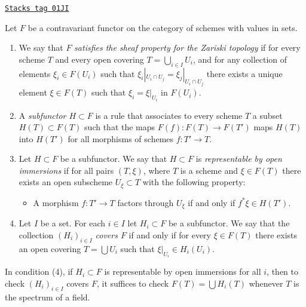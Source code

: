 \begin{definition}
\label{schemes-definition-representable-by-open-immersions}
\href{https://stacks.math.columbia.edu/tag/01JI}{\texttt{Stacks tag 01JI}}

Let $F$ be a contravariant functor on the category
of schemes with values in sets.
\begin{enumerate}
\item We say that $F$ {\it satisfies the sheaf property for the
Zariski topology} if for every scheme $T$ and every open covering
$T = \bigcup_{i \in I} U_i$, and for any collection of elements
$\xi_i \in F(U_i)$ such that $\xi_i|_{U_i \cap U_j} =
\xi_j|_{U_i \cap U_j}$ there exists a unique element
$\xi \in F(T)$ such that $\xi_i = \xi|_{U_i}$ in $F(U_i)$.
\item A {\it subfunctor $H \subset F$} is a rule that associates
to every scheme $T$ a subset $H(T) \subset F(T)$ such that
the maps $F(f) : F(T) \to F(T')$ maps $H(T)$ into
$H(T')$ for all morphisms of schemes $f : T' \to T$.
\item Let $H \subset F$ be a subfunctor. We say that
$H \subset F$ is {\it representable by open immersions}
if for all pairs $(T, \xi)$, where $T$ is a scheme and $\xi \in F(T)$
there exists an open subscheme $U_\xi \subset T$ with the following
property:
\begin{itemize}
\item[(*)] A morphism $f : T' \to T$ factors through $U_\xi$ if and only
if $f^*\xi \in H(T')$.
\end{itemize}
\item Let $I$ be a set. For each $i \in I$ let $H_i \subset F$
be a subfunctor. We say that the collection $(H_i)_{i \in I}$
{\it covers $F$} if and only if for every $\xi \in F(T)$
there exists an open covering $T = \bigcup U_i$ such that
$\xi|_{U_i} \in H_i(U_i)$.
\end{enumerate}
\end{definition}

In condition (4), if $H_i \subset F$ is representable by open immersions
for all $i$, then to check $(H_i)_{i \in I}$ covers $F$, it suffices to
check $F(T) = \bigcup H_i(T)$ whenever $T$ is the spectrum of a field.

